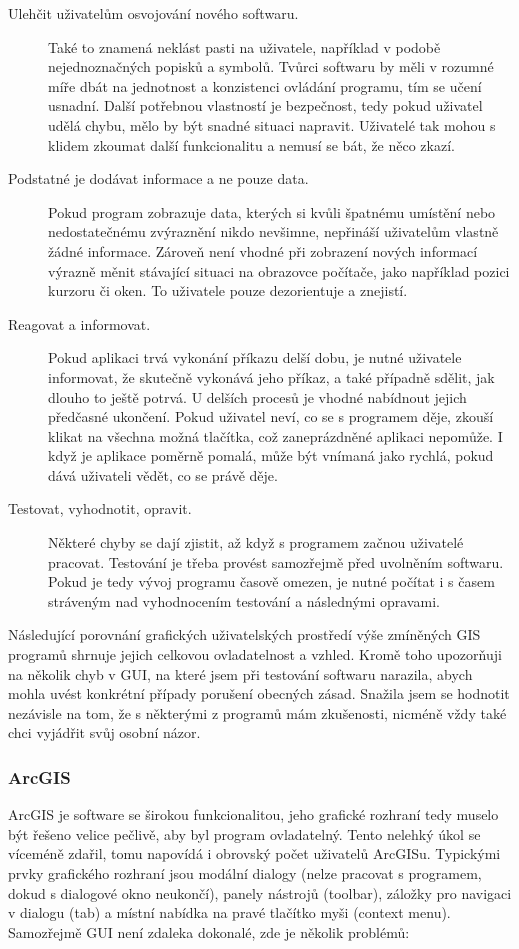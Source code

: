 \documentclass[a4paper,12pt,draft]{article}
\begin{document}
\begin{description}
\item [Ulehčit uživatelům osvojování nového softwaru.] Také to znamená
neklást pasti na uživatele, například v podobě nejednoznačných popisků
a symbolů. Tvůrci softwaru by měli v rozumné míře dbát na jednotnost
a konzistenci ovládání programu, tím se učení usnadní. Další
potřebnou vlastností je bezpečnost, tedy pokud uživatel udělá chybu,
mělo by být snadné situaci napravit. Uživatelé tak mohou s klidem
zkoumat další funkcionalitu a nemusí se bát, že něco zkazí.

\item [Podstatné je dodávat informace a ne pouze data.] Pokud program
zobrazuje data, kterých si kvůli špatnému umístění nebo nedostatečnému
zvýraznění nikdo nevšimne, nepřináší uživatelům vlastně žádné
informace. Zároveň není vhodné při zobrazení nových informací výrazně
měnit stávající situaci na obrazovce počítače, jako například pozici
kurzoru či oken. To uživatele pouze dezorientuje a znejistí.

\item [Reagovat a informovat.] Pokud aplikaci trvá vykonání příkazu
delší dobu, je nutné uživatele informovat, že skutečně vykonává
jeho příkaz, a také případně sdělit, jak dlouho to ještě potrvá. U
delších procesů je vhodné nabídnout jejich předčasné ukončení. Pokud
uživatel neví, co se s programem děje, zkouší klikat na všechna možná
tlačítka, což zaneprázdněné aplikaci nepomůže. I když je aplikace
poměrně pomalá, může být vnímaná jako rychlá, pokud dává uživateli
vědět, co se právě děje.

\item [Testovat, vyhodnotit, opravit.] Některé chyby se dají zjistit,
až když s programem začnou uživatelé pracovat. Testování je třeba
provést samozřejmě před uvolněním softwaru. Pokud je tedy vývoj
programu časově omezen, je nutné počítat i s časem stráveným nad
vyhodnocením testování a následnými opravami.
 \end{description}

Následující porovnání grafických uživatelských prostředí
výše zmíněných GIS programů shrnuje jejich celkovou ovladatelnost a
vzhled. Kromě toho upozorňuji na několik chyb v GUI, na které jsem při
testování softwaru narazila, abych mohla uvést konkrétní případy
porušení obecných zásad. Snažila jsem se hodnotit nezávisle na tom,
že s některými z programů mám zkušenosti, nicméně vždy také chci
vyjádřit svůj osobní názor.

\subsubsection{ArcGIS}
ArcGIS je software se širokou funkcionalitou, jeho grafické rozhraní tedy
muselo být řešeno velice pečlivě, aby byl program ovladatelný. Tento
nelehký úkol se víceméně zdařil, tomu napovídá i obrovský počet
uživatelů ArcGISu. Typickými prvky grafického rozhraní jsou modální
dialogy (nelze pracovat s programem, dokud s dialogové okno neukončí),
panely nástrojů (toolbar), záložky pro navigaci v dialogu (tab) a místní
nabídka na pravé tlačítko myši (context menu).
Samozřejmě GUI není zdaleka dokonalé, zde je několik problémů:
\end{document}
